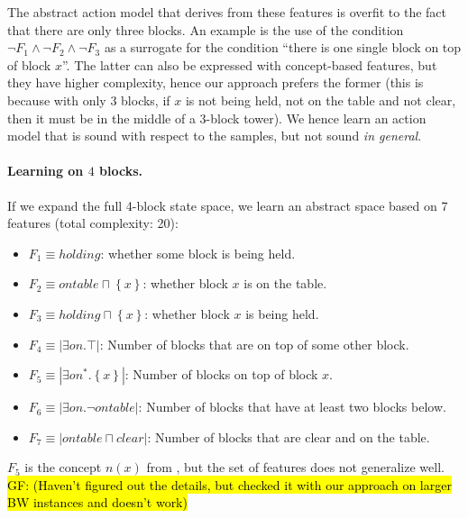 \documentclass[12pt]{article}
\newcommand\gf[1]{\sethlcolor{yellow}\hl{GF: #1}}
\newcommand{\set}[1]{\ensuremath{\left\{#1 \right\}}}
\newcommand{\abs}[1]{\ensuremath{\left\vert{#1}\right\vert}}
\begin{document}
\noindent
The abstract action model that derives from these features is overfit to the fact that there are only three blocks.
An example is the use of the condition $\neg F_1 \land \neg F_2 \land \neg F_3$ as a surrogate for the 
condition ``there is one single block on top of block $x$''. The latter can also be expressed with concept-based
features, but they have higher complexity, hence our approach prefers the former (this is because 
with only 3 blocks, if $x$ is not being held, not on the table and not clear, then it must be in the middle
of a 3-block tower). We hence learn an action model that is sound with respect to the samples, but not sound \emph{in general}.


\paragraph{Learning on $4$ blocks.}
If we expand the full 4-block state space, 
 we learn an abstract space based on 7 features (total complexity: 20):

 
 
 
\begin{itemize}
 \item $F_1 \equiv holding$: whether some block is being held.
 \item $F_2 \equiv ontable \sqcap \set{x}$: whether block $x$ is on the table.
 \item $F_3 \equiv holding \sqcap \set{x}$: whether block $x$ is being held.
 \item $F_4 \equiv \abs{\exists on . \top}$: Number of blocks that are on top of some other block.
 \item $F_5 \equiv \abs{\exists on^* . \set{x}}$: Number of blocks on top of block $x$.
 \item $F_6 \equiv \abs{\exists on . \neg ontable}$: Number of blocks that have at least two blocks below.
 \item $F_7 \equiv \abs{ontable \sqcap clear}$: Number of blocks that are clear and on the table.


\end{itemize}
  
\noindent
$F_5$ is the concept $n(x)$ from \citep{bonet2018features}, but the set of features does not generalize well.
\gf{(Haven't figured out the details, but checked it with our approach on larger BW instances and doesn't work)}
\end{document}
